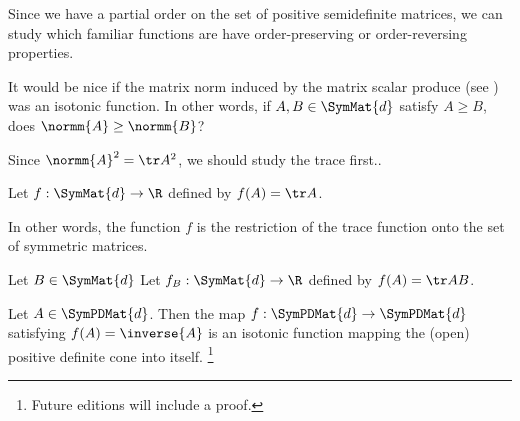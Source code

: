 

Since we have a partial order on the set of positive semidefinite matrices, we can study which familiar functions are have order-preserving or order-reversing properties.


It would be nice if the matrix norm induced by the matrix scalar produce (see ) was an isotonic function.
In other words, if $A, B \in \SymMat{d}$ satisfy $A \geq B$, does $\normm{A} \geq \normm{B}$?

Since $\normm{A}^2 = \tr A^2$, we should study the trace first..


\begin{proposition}
Let $f: \SymMat{d} \to \R $ defined by $f(A) = \tr A$.
\end{proposition}

In other words, the function $f$ is the restriction of the trace function onto the set of symmetric matrices.

\begin{proposition}
Let $B \in \SymMat{d}$
Let $f_B: \SymMat{d} \to \R $ defined by $f(A) = \tr AB$.
\end{proposition}


\begin{proposition}
Let $A \in \SymPDMat{d}$.
Then the map $f: \SymPDMat{d} \to \SymPDMat{d}$ satisfying $f(A) = \inverse{A}$ is an isotonic function mapping the (open) positive definite cone into itself.
  \ifhmode\unskip\fi\footnote{
Future editions will include a proof.
  }
\end{proposition}

\blankpage

